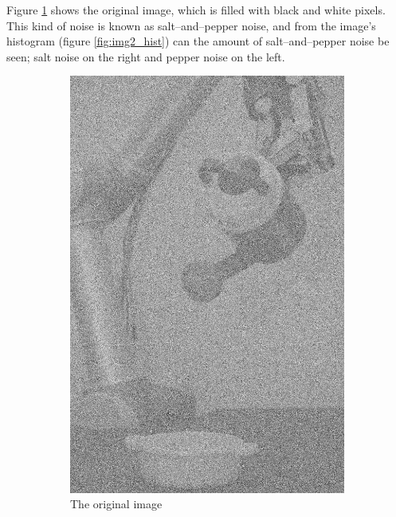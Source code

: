 Figure \ref{fig:img2_src} shows the original image, which is filled with black and white pixels. This kind of noise is known as salt--and--pepper noise, and from the image's histogram (figure \ref{fig:img2_hist}) can the amount of salt--and--pepper noise be seen; salt noise on the right and pepper noise on the left. 
\begin{figure}[H]
    \centering
    \begin{subfigure}[b]{0.25\textwidth}
        \includegraphics[width=\textwidth]{img2/src.png}
        \caption{The original image}
        \label{fig:img2_src}
    \end{subfigure}
    \begin{subfigure}[b]{0.485\textwidth}

\end{subfigure}
\end{figure}
